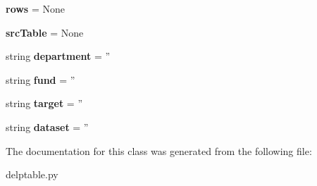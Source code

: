 \begin{DoxyCompactItemize}
\item 
\hypertarget{classdelptable_1_1TableData_a4678be08586e227dc4eaadedf1e176e9}{
{\bfseries rows} = None}
\label{classdelptable_1_1TableData_a4678be08586e227dc4eaadedf1e176e9}

\item 
\hypertarget{classdelptable_1_1TableData_a6bd14e25f7765f949a8c95ec45ae87d6}{
{\bfseries srcTable} = None}
\label{classdelptable_1_1TableData_a6bd14e25f7765f949a8c95ec45ae87d6}

\item 
\hypertarget{classdelptable_1_1TableData_ab25082c54332bec44f12a47da216dd06}{
string {\bfseries department} = ''}
\label{classdelptable_1_1TableData_ab25082c54332bec44f12a47da216dd06}

\item 
\hypertarget{classdelptable_1_1TableData_aa16546be6c33d41e893354277b457e13}{
string {\bfseries fund} = ''}
\label{classdelptable_1_1TableData_aa16546be6c33d41e893354277b457e13}

\item 
\hypertarget{classdelptable_1_1TableData_aa13b954f5104ef044e216a1113aa258e}{
string {\bfseries target} = ''}
\label{classdelptable_1_1TableData_aa13b954f5104ef044e216a1113aa258e}

\item 
\hypertarget{classdelptable_1_1TableData_aea9b8fcc97f0aff545d27f83feb87cbc}{
string {\bfseries dataset} = ''}
\label{classdelptable_1_1TableData_aea9b8fcc97f0aff545d27f83feb87cbc}

\end{DoxyCompactItemize}


The documentation for this class was generated from the following file:\begin{DoxyCompactItemize}
\item 
delptable.py\end{DoxyCompactItemize}
